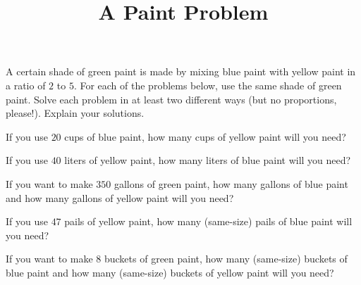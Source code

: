 \documentclass[nooutcomes,noauthor,handout]{ximera}
\title{A Paint Problem}
\begin{document}
\begin{abstract}
\end{abstract}
\maketitle


A certain shade of green paint is made by mixing blue paint with yellow paint in a ratio of $2$ to $5$.  For each of the problems below, use the same shade of green paint.  Solve each problem in at least two different ways (but no proportions, please!).  Explain your solutions.

\begin{problem}
If you use $20$ cups of blue paint, how many cups of yellow paint will you need?
\end{problem}

\begin{problem}
If you use $40$ liters of yellow paint, how many liters of blue paint will you need?
\end{problem}

\begin{problem}
If you want to make $350$ gallons of green paint, how many gallons of blue paint and how many gallons of yellow paint will you need?
\end{problem}

\begin{problem}
If you use $47$ pails of yellow paint, how many (same-size) pails of blue paint will you need?
\end{problem}

\begin{problem}
If you want to make $8$ buckets of green paint, how many (same-size) buckets of blue paint and how many (same-size) buckets of yellow paint will you need?
\end{problem}

\newpage
\end{document}
